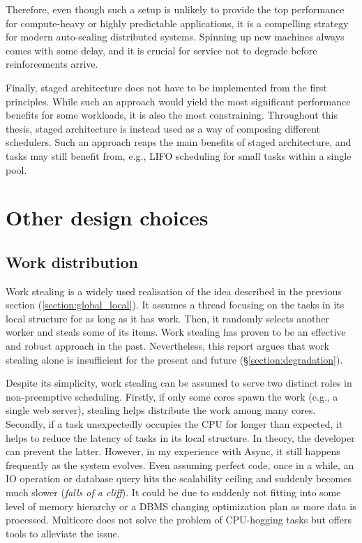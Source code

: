 \documentclass[12pt,a4paper,twoside]{report}
\begin{document}
Therefore, even though such a setup is unlikely to provide the top performance for compute-heavy or highly predictable applications, it is a compelling strategy for modern auto-scaling distributed systems. Spinning up new machines always comes with some delay, and it is crucial for service not to degrade before reinforcements arrive.

\label{section:staged-as-composition}
Finally, staged architecture does not have to be implemented from the first principles. While such an approach would yield the most significant performance benefits for some workloads, it is also the most constraining. Throughout this thesis, staged architecture is instead used as a way of composing different schedulers. Such an approach reaps the main benefits of staged architecture, and tasks may still benefit from, e.g., LIFO scheduling for small tasks within a single pool. 

\section{Other design choices}
\label{section:other_design_choices}

\subsection{Work distribution}
\label{section:work-distribution}

Work stealing is a widely used realisation of the idea described in the previous section (\ref{section:global_local}). It assumes a thread focusing on the tasks in its local structure for as long as it has work. Then, it randomly selects another worker and steals some of its items. Work stealing has proven to be an effective and robust approach in the past. Nevertheless, this report argues that work stealing alone is insufficient for the present and future (\S\ref{section:degradation}). 

Despite its simplicity, work stealing can be assumed to serve two distinct roles in non-preemptive scheduling. Firstly, if only some cores spawn the work (e.g., a single web server), stealing helps distribute the work among many cores. Secondly, if a task unexpectedly occupies the CPU for longer than expected, it helps to reduce the latency of tasks in its local structure. In theory, the developer can prevent the latter. However, in my experience with Async, it still happens frequently as the system evolves. Even assuming perfect code, once in a while, an IO operation or database query hits the scalability ceiling and suddenly becomes much slower (\textit{falls of a cliff}). It could be due to suddenly not fitting into some level of memory hierarchy or a DBMS changing optimization plan as more data is processed. Multicore does not solve the problem of CPU-hogging tasks but offers tools to alleviate the issue.
\end{document}
